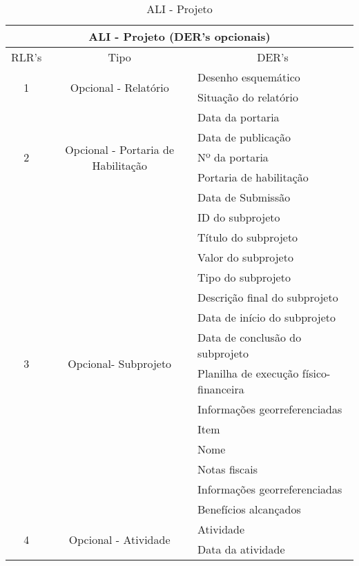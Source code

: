       \begin{table}[!h]
      \centering
      \caption{ALI - Projeto}
      \label{ali_projeto}
      \begin{tabular}{|c|c|l|}
      \hline
      \multicolumn{3}{|c|}{\textbf{ALI - Projeto (DER's opcionais)}}                                                      \\ \hline
      \multicolumn{1}{|l|}{RLR's} & Tipo                         & \multicolumn{1}{c|}{DER's}  \\ \hline
      \multirow{2}{*}{1}         &\multirow{2}{*}{Opcional - Relatório}    & Desenho esquemático\\ \cline{3-3}
				  &				& Situação do relatório \\ \hline
      \multirow{5}{*}{2}         &\multirow{5}{*}{Opcional - Portaria de Habilitação}    & Data da portaria   \\ \cline{3-3}   
				  &						& Data de publicação   \\ \cline{3-3} 
				  &						& Nº da portaria      \\ \cline{3-3} 
				  &						& Portaria de habilitação        \\ \cline{3-3}
				  &						& Data de Submissão    \\ \cline{3-3} 
      \multirow{14}{*}{3}         &\multirow{14}{*}{Opcional- Subprojeto}    & ID do subprojeto               \\ \cline{3-3} 
				  &                              & Título do subprojeto             \\ \cline{3-3} 
				  &                              & Valor do subprojeto      \\ \cline{3-3} 
				  &                              & Tipo do subprojeto          \\ \cline{3-3} 
				  &                              & Descrição final do subprojeto          \\ \cline{3-3} 
				  &                              & Data de início do subprojeto                  \\ \cline{3-3} 
				  &                              & Data de conclusão do subprojeto                 \\ \cline{3-3}
				  &				 & Planilha de execução físico-financeira \\ \cline{3-3} 
				  &  				 & Informações georreferenciadas \\ \cline{3-3}         
				  &				 & Item \\ \cline{3-3} 
				  &  				 & Nome \\ \cline{3-3}
				  &				 & Notas fiscais \\ \cline{3-3} 
				  &  				 & Informações georreferenciadas \\ \cline{3-3}         
				  &                              & Benefícios alcançados    \\ \hline
            \multirow{2}{*}{4}         &\multirow{2}{*}{Opcional - Atividade}    & Atividade \\ \cline{3-3}
				  &				& Data da atividade \\ \hline
      \end{tabular}
      \end{table}
      

